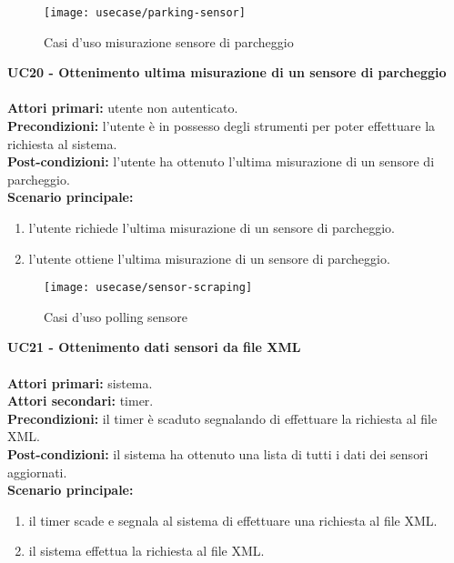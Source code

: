 \leavevmode\newline
\begin{figure}[H]
    \centering
    \texttt{[image: usecase/parking-sensor]}
    \caption{Casi d'uso misurazione sensore di parcheggio}
\end{figure}
\textbf{UC20 - Ottenimento ultima misurazione di un sensore di parcheggio}
\\\\
\textbf{Attori primari:} utente non autenticato.
\\
\textbf{Precondizioni:} l'utente è in possesso degli strumenti per poter effettuare la richiesta al sistema.
\\
\textbf{Post-condizioni:} l'utente ha ottenuto l'ultima misurazione di un sensore di parcheggio.
\\
\textbf{Scenario principale:}
\begin{enumerate}
    \item l'utente richiede l'ultima misurazione di un sensore di parcheggio.
    \item l'utente ottiene l'ultima misurazione di un sensore di parcheggio.
\end{enumerate}

\leavevmode\newline
\begin{figure}[H]
    \centering
    \texttt{[image: usecase/sensor-scraping]}
    \caption{Casi d'uso polling sensore}
\end{figure}
\textbf{UC21 - Ottenimento dati sensori da file XML}
\\\\
\textbf{Attori primari:} sistema.
\\
\textbf{Attori secondari:} timer.
\\
\textbf{Precondizioni:} il timer è scaduto segnalando di effettuare la richiesta al file \gls{XML}.
\\
\textbf{Post-condizioni:} il sistema ha ottenuto una lista di tutti i dati dei sensori aggiornati.
\\
\textbf{Scenario principale:}
\begin{enumerate}
    \item il timer scade e segnala al sistema di effettuare una richiesta al file \gls{XML}.
    \item il sistema effettua la richiesta al file \gls{XML}.
\end{enumerate}

